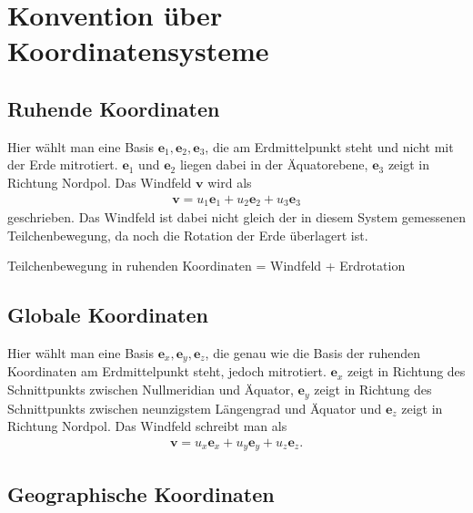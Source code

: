 \documentclass{book}
\begin{document}
\section{Konvention über Koordinatensysteme}
\label{sec:konvention_ueber_koordinatensysteme}

\subsection{Ruhende Koordinaten}
\label{sec:ruhende_koordinaten}

Hier wählt man eine Basis $\mathbf{e}_1, \mathbf{e}_2, \mathbf{e}_3$, die am Erdmittelpunkt steht und nicht mit der Erde mitrotiert. $\mathbf{e}_1$ und $\mathbf{e}_2$ liegen dabei in der Äquatorebene, $\mathbf{e}_3$ zeigt in Richtung Nordpol. Das Windfeld $\mathbf{v}$ wird als
%
\begin{eqnarray}
\mathbf{v} = u_1\mathbf{e}_1 + u_2\mathbf{e}_2 + u_3\mathbf{e}_3
\end{eqnarray}
%
geschrieben. Das Windfeld ist dabei nicht gleich der in diesem System gemessenen Teilchenbewegung, da noch die Rotation der Erde überlagert ist.
%
\begin{center}
Teilchenbewegung in ruhenden Koordinaten = Windfeld + Erdrotation
\end{center}
%
\subsection{Globale Koordinaten}
\label{sec:globale_koordinaten}

Hier wählt man eine Basis $\mathbf{e}_x, \mathbf{e}_y, \mathbf{e}_z$, die genau wie die Basis der ruhenden Koordinaten am Erdmittelpunkt steht, jedoch mitrotiert. $\mathbf{e}_x$ zeigt in Richtung des Schnittpunkts zwischen Nullmeridian und Äquator, $\mathbf{e}_y$ zeigt in Richtung des Schnittpunkts zwischen neunzigstem Längengrad und Äquator und $\mathbf{e}_z$ zeigt in Richtung Nordpol. Das Windfeld schreibt man als
%
\begin{eqnarray}
\mathbf{v} = u_x\mathbf{e}_x + u_y\mathbf{e}_y + u_z\mathbf{e}_z.
\end{eqnarray}
%
\subsection{Geographische Koordinaten}
\label{sec:geographische_koordinaten}
\end{document}
